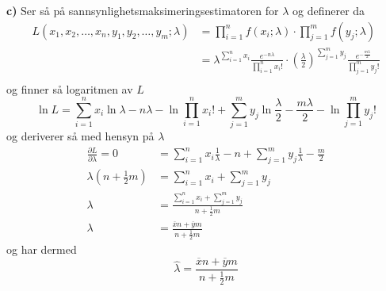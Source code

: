\documentclass{report}
\newcommand{\nbrack}[1]{\left( #1 \right)}
\begin{document}
\textbf{c)}
Ser så på sannsynlighetsmaksimeringsestimatoren for $\lambda$ og definerer da
\begin{equation}
  \label{eq:24}
  \begin{split}
    L(x_{1}, x_{2}, \dots , x_{n} , y_{1}, y_{2}, \dots, y_{m}; \lambda)
    &= \prod_{i = 1}^{n} f(x_{i}; \lambda) \cdot \prod_{j=1}^{m} f(y_{j}; \lambda) \\
    &= \lambda^{\sum_{i=1}^{n} x_{i}} \frac{e^{-n\lambda}}{\prod_{i=1}^{n}x_{i}!} \cdot \nbrack{\frac{\lambda}{2}}^{\sum_{j=1}^{m}y_{j}} \frac{e^{-\frac{m\lambda}{2}}}{\prod_{j=1}^{m}y_{j}!} \\
  \end{split}
\end{equation}
og finner så logaritmen av $L$
\begin{equation}
  \label{eq:25}
  \ln L = \sum_{i=1}^{n} x_{i} \ln \lambda - n\lambda - \ln \prod_{i=1}^{n} x_{i}! + \sum_{j=1}^{m} y_{j} \ln \frac{\lambda}{2} - \frac{m\lambda}{2} - \ln \prod_{j=1}^{m} y_{j}!
\end{equation}
og deriverer så med hensyn på $\lambda$
\begin{equation}
  \label{eq:26}
  \begin{split}
    \frac{\partial L}{\partial \lambda} = 0 &= \sum_{i=1}^{n} x_{i} \frac{1}{\lambda} - n + \sum_{j=1}^{m} y_{j} \frac{1}{\lambda} - \frac{m}{2} \\
    \lambda \nbrack{ n + \frac{1}{2}m } &= \sum_{i=1}^{n} x_{i} + \sum_{j=1}^{m} y_{j} \\
    \lambda &= \frac{\sum_{i=1}^{n} x_{i} + \sum_{j=1}^{m} y_{j}}{n + \frac{1}{2}m} \\
    \lambda &= \frac{\overline{x}n + \overline{y}m}{n + \frac{1}{2}m}
  \end{split}
\end{equation}
og har dermed
\begin{equation}
  \label{eq:27}
  \hat{\lambda} = \frac{\overline{x}n + \overline{y}m}{n + \frac{1}{2}m}
\end{equation}
\end{document}
